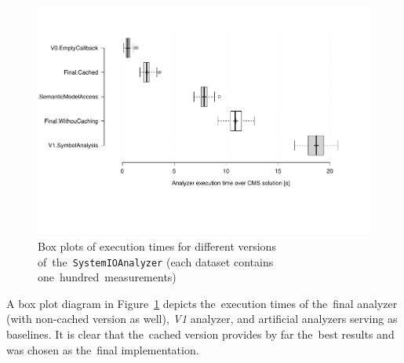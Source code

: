 \documentclass[
  digital, %
  table,   %
  lof,     %
  lot,     %
  oneside,
]{fithesis3}
\begin{document}
\begin{figure}
		\centering
			\includegraphics[scale=0.23]{img/system-io-versions-boxpolt}
		\caption{Box plots of execution times for different versions of~the~\texttt{SystemIOAnalyzer} (each dataset contains one~hundred~measurements)}
		\label{fig:system-io-versions-boxplots}
\end{figure}

A box plot diagram in Figure~\ref{fig:system-io-versions-boxplots} depicts the~execution times of the~final analyzer (with non-cached version as well), \textit{V1} analyzer, and artificial analyzers serving as baselines. It is clear that the~cached version provides by far the~best results and was chosen as the~final implementation.
\end{document}
